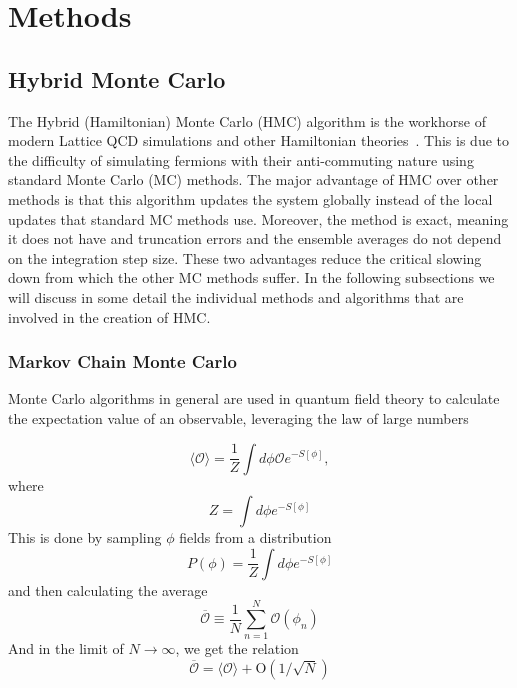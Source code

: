 
\chapter{Methods}
\label{sec:methods}
\section{Hybrid Monte Carlo}
\label{sec:hmc}
The Hybrid (Hamiltonian) Monte Carlo (HMC) algorithm is the workhorse of modern Lattice QCD simulations and other Hamiltonian theories~\cite{hmccm}. This is due to the difficulty of simulating fermions with their anti-commuting nature using standard Monte Carlo (MC) methods. The major advantage of HMC over other methods is that this algorithm updates the system globally instead of the local updates that standard MC methods use. Moreover, the method is exact, meaning it does not have and truncation errors and the ensemble averages do not depend on the integration step size. These two advantages reduce the critical slowing down from which the other MC methods suffer. In the following subsections we will discuss in some detail the individual methods and algorithms that are involved in the creation of HMC.

\subsection{Markov Chain Monte Carlo}

Monte Carlo algorithms in general are used in quantum field theory to calculate the expectation value of an observable, leveraging the law of large numbers

\begin{equation}
    \langle\mathcal{O}\rangle = \frac{1}{Z} \int d\phi \mathcal{O} e^{-S[\phi]},
\end{equation}
where
\begin{equation}
    Z = \int d\phi e^{-S[\phi]}
\end{equation}
This is done by sampling $\phi$ fields from a distribution
\begin{equation}
    P(\phi) = \frac{1}{Z} \int d\phi e^{-S[\phi]}
\end{equation}
and then calculating the average
\begin{equation}
    \overline{\mathcal{O}} \equiv \frac{1}{N}\sum^{N}_{n=1} \mathcal{O}(\phi_n)
    \label{eq:ensamble_average}
\end{equation}
And in the limit of $N \to \infty$, we get the relation
\begin{equation}
    \overline{\mathcal{O}} = \langle\mathcal{O}\rangle + \mathrm{O}(1/\sqrt{N})
\end{equation}

